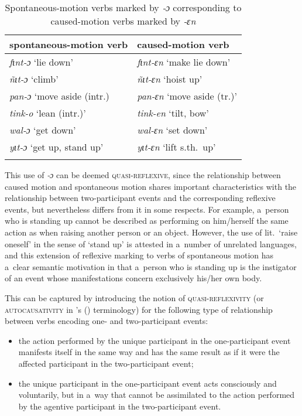 \documentclass[output=paper]{langscibook}
\begin{document}
\begin{table}[ht]
  \centering
  \begin{tabular}{ll}
    \lsptoprule
    {spontaneous-motion verb} & {caused-motion verb} \\
    \hline
    \textit{fɩnt-ɔ} `lie down' & \textit{fɩnt-ɛn} `make lie down' \\
    \textit{ñɩt-ɔ} `climb' & \textit{ñɩt-ɛn} `hoist up' \\
    \textit{pan-ɔ} `move aside (intr.) & \textit{pan-ɛn} `move aside (tr.)' \\
    \textit{tink-o} `lean (intr.)' & \textit{tink-en} `tilt, bow' \\
    \textit{wal-ɔ} `get down' & \textit{wal-ɛn} `set down' \\
    \textit{yɩt-ɔ} `get up, stand up' & \textit{yɩt-ɛn} `lift s.th.\ up' \\
    \lspbottomrule
  \end{tabular}
  \caption{Spontaneous-motion verbs marked by \textit{‑ɔ} corresponding to
    caused-motion verbs marked by \textit{‑ɛn}}%
  \label{tab:Creissels:o-spontaneous-motion-en}
\end{table}

This use of \textit{‑ɔ} can be deemed \textsc{quasi-reflexive}, since the
relationship between caused motion and spontaneous motion shares important
characteristics with the relationship between two-participant events and the
corresponding reflexive events, but nevertheless differs from it in some
respects.  For example, a~person who is standing up cannot be described as
performing on him/herself the same action as when raising another person or an
object.  However, the use of lit.\ `raise oneself' in the sense of `stand up'
is attested in a~number of unrelated languages, and this extension of reflexive
marking to verbs of spontaneous motion has a~clear semantic motivation in that
a~person who is standing up is the instigator of an event whose manifestations
concern exclusively his/her own body.

This can be captured by introducing the notion of \textsc{quasi-reflexivity}
(or \textsc{autocausativity} in \citeauthor{Geniušienė1987}'s
(\citeyear{Geniušienė1987}) terminology) for the following type of relationship
between verbs encoding one- and two-participant events:

\begin{itemize}
\item the action performed by the unique participant in the one-participant
  event manifests itself in the same way and has the same result as if it were
  the affected participant in the two-participant event;
\item the unique participant in the one-participant event acts consciously and
  voluntarily, but in a~way that cannot be assimilated to the action performed
  by the agentive participant in the two-participant event.
\end{itemize}
\end{document}
